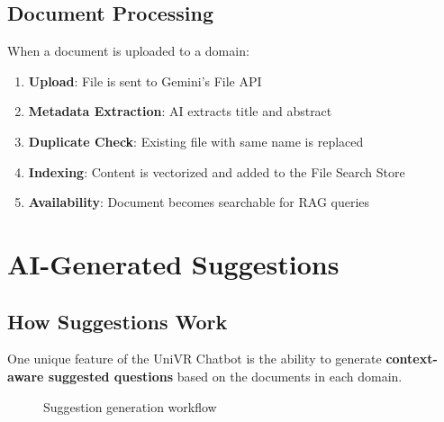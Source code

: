 \documentclass[12pt,a4paper]{article}
\begin{document}
\subsection{Document Processing}

When a document is uploaded to a domain:

\begin{enumerate}
    \item \textbf{Upload}: File is sent to Gemini's File API
    \item \textbf{Metadata Extraction}: AI extracts title and abstract
    \item \textbf{Duplicate Check}: Existing file with same name is replaced
    \item \textbf{Indexing}: Content is vectorized and added to the File Search Store
    \item \textbf{Availability}: Document becomes searchable for RAG queries
\end{enumerate}

\section{AI-Generated Suggestions}

\subsection{How Suggestions Work}

One unique feature of the UniVR Chatbot is the ability to generate \textbf{context-aware suggested questions} based on the documents in each domain.

\begin{figure}[H]
    \centering
    \caption{Suggestion generation workflow}
    \label{fig:suggestions}
\end{figure}
\end{document}
